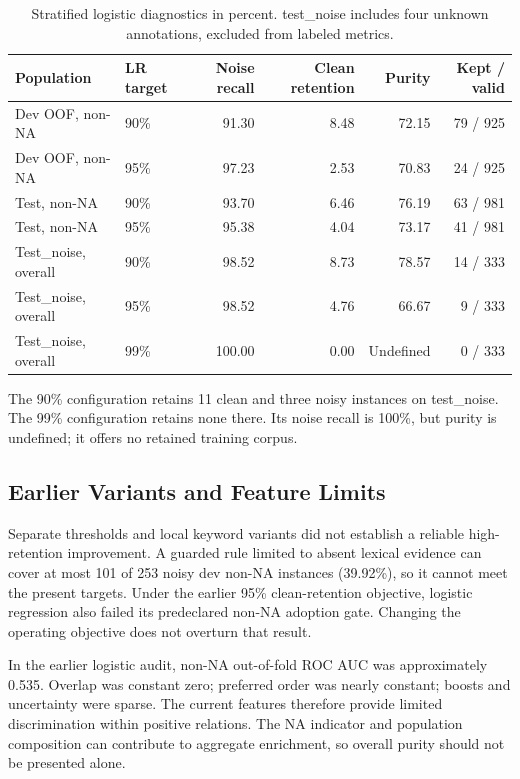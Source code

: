 \documentclass[11pt]{article}
\begin{document}
\begin{table}[t]
\centering\small
\begin{tabular}{llrrrr}\toprule
Population & LR target & Noise recall & Clean retention & Purity & Kept / valid\\\midrule
Dev OOF, non-NA &90\%&91.30&8.48&72.15&79 / 925\\
Dev OOF, non-NA &95\%&97.23&2.53&70.83&24 / 925\\
Test, non-NA &90\%&93.70&6.46&76.19&63 / 981\\
Test, non-NA &95\%&95.38&4.04&73.17&41 / 981\\
Test\_noise, overall &90\%&98.52&8.73&78.57&14 / 333\\
Test\_noise, overall &95\%&98.52&4.76&66.67&9 / 333\\
Test\_noise, overall &99\%&100.00&0.00&Undefined&0 / 333\\\bottomrule
\end{tabular}
\caption{Stratified logistic diagnostics in percent. test\_noise includes four unknown annotations, excluded from labeled metrics.}\label{tab:strata}
\end{table}

The 90\% configuration retains 11 clean and three noisy instances on test\_noise. The 99\% configuration retains none there. Its noise recall is 100\%, but purity is undefined; it offers no retained training corpus.

\subsection{Earlier Variants and Feature Limits}
Separate thresholds and local keyword variants did not establish a reliable high-retention improvement. A guarded rule limited to absent lexical evidence can cover at most 101 of 253 noisy dev non-NA instances (39.92\%), so it cannot meet the present targets. Under the earlier 95\% clean-retention objective, logistic regression also failed its predeclared non-NA adoption gate. Changing the operating objective does not overturn that result.

In the earlier logistic audit, non-NA out-of-fold ROC AUC was approximately 0.535. Overlap was constant zero; preferred order was nearly constant; boosts and uncertainty were sparse. The current features therefore provide limited discrimination within positive relations. The NA indicator and population composition can contribute to aggregate enrichment, so overall purity should not be presented alone.
\end{document}
